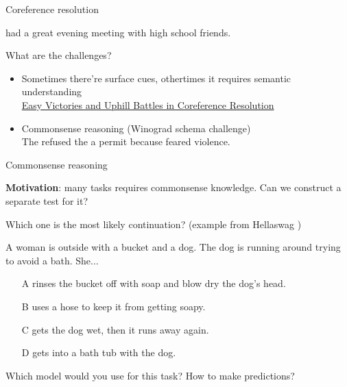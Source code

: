 \documentclass[usenames,dvipsnames,notes,11pt,aspectratio=169,hyperref={colorlinks=true, linkcolor=blue}]{beamer}
\newcommand{\pdfnote}[1]{}
\begin{document}
\begin{frame}
    {Coreference resolution}

     had a great evening meeting with  high school friends.\par

    What are the challenges?\\\pause
    \begin{itemize}
        \item Sometimes there're surface cues, othertimes it requires semantic understanding\\
            \href{https://nlp.cs.berkeley.edu/pubs/Durrett-Klein_2013_Coreference_paper.pdf}{Easy Victories and Uphill Battles in Coreference Resolution} 
        \item Commonsense reasoning (Winograd schema challenge)\\\medskip
            The  refused the  a permit because  feared violence.\par
    \end{itemize}
\end{frame}

\begin{frame}
    {Commonsense reasoning}

    \textbf{Motivation}: many tasks requires commonsense knowledge. Can we construct a separate test for it?\pause

    \medskip
    Which one is the most likely continuation? (example from Hellaswag )

    A woman is outside with a bucket and a dog. The dog is running around trying to avoid a bath. She...\\
    \begin{itemize}
        \item[A] rinses the bucket off with soap and blow dry the dog’s head.
        \item[B] uses a hose to keep it from getting soapy.
        \item[C] gets the dog wet, then it runs away again.
        \item[D] gets into a bath tub with the dog.
    \end{itemize}
    \pdfnote{C}

    Which model would you use for this task? How to make predictions?
\end{frame}
\end{document}
